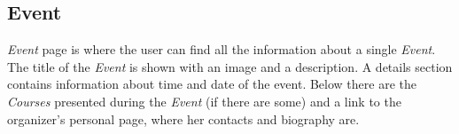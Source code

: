 \documentclass[../../DD.tex]{subfiles}
\begin{document}
	\subsection{Event}
		\textit{Event} page is where the user can find all the information about a single \textit{Event}. The title of the \textit{Event} is shown with an image and a description. A details section contains information about time and date of the event. Below there are the \textit{Courses} presented during the \textit{Event} (if there are some) and a link to the organizer's personal page, where her contacts and biography are.
		\newline
\end{document}
